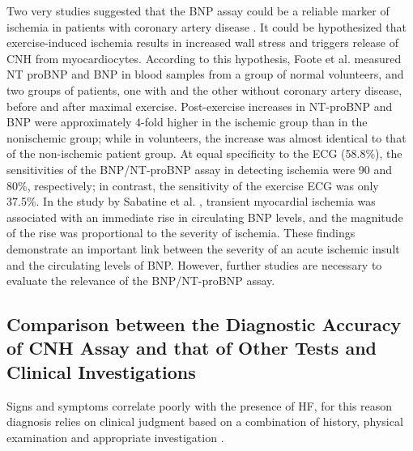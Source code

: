 \documentclass[14pt,a4paper,onecolumn]{extarticle}
\begin{document}
Two very  studies suggested that the BNP assay could be a reliable marker of ischemia in patients with coronary artery disease \citep{bib3163} \citep{bib3164}. %
It could be hypothesized that exercise-induced ischemia results in increased wall stress and triggers release of CNH from myocardiocytes. According to this hypothesis, Foote et al. \citep{bib3163} measured NT proBNP and BNP in blood samples from a group of normal volunteers, and two groups of patients, one with and the other without coronary artery disease, before and after maximal exercise. Post-exercise increases in NT-proBNP and BNP were approximately 4-fold higher in the ischemic group than in the nonischemic group; while in volunteers, the increase was almost identical to that of the non-ischemic patient group. At equal specificity to the ECG (58.8\%), the sensitivities of the BNP/NT-proBNP assay in detecting ischemia were 90 and 80\%, respectively; in contrast, the sensitivity of the exercise ECG was only 37.5\%. In the study by Sabatine et al. \citep{bib3164}, transient myocardial ischemia was associated with an immediate rise in circulating BNP levels, and the magnitude of the rise was proportional to the severity of ischemia. These findings demonstrate an important link between the severity of an acute ischemic insult and the circulating levels of BNP. However, further studies are necessary to evaluate the relevance of the BNP/NT-proBNP assay.

\subsection{ Comparison between the Diagnostic Accuracy of CNH Assay and that of Other Tests and Clinical Investigations}

Signs and symptoms correlate poorly with the presence of HF, for this reason diagnosis relies on clinical judgment based on a combination of history, physical examination and appropriate investigation \citep{bib365} \citep{bib369} \citep{bib370} \citep{bib3168}.

\end{document}
